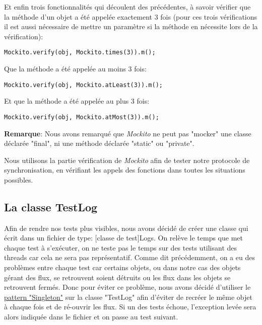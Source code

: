 Et enfin trois fonctionnalités qui découlent des précédentes, à savoir vérifier que la méthode d'un objet a été appelée exactement 3 fois (pour ces trois vérifications il est aussi nécessaire de mettre un paramètre si la méthode en nécessite lors de la vérification):

\begin{lstlisting}
Mockito.verify(obj, Mockito.times(3)).m();
\end{lstlisting}\bigskip

Que la méthode a été appelée au moins 3 fois:

\begin{lstlisting}
Mockito.verify(obj, Mockito.atLeast(3)).m();
\end{lstlisting}\bigskip

Et que la méthode a été appelée au plus 3 fois:

\begin{lstlisting}
Mockito.verify(obj, Mockito.atMost(3)).m();
\end{lstlisting}\bigskip

\textbf{Remarque}: Nous avons remarqué que \textit{Mockito} ne peut pas "mocker" une classe déclarée "final", ni une méthode déclarée "static" ou "private".\newline

Nous utilisons la partie vérification de \textit{Mockito} afin de tester notre protocole de synchronisation, en vérifiant les appels des fonctions dans toutes les situations possibles.

\newpage
\subsection{La classe TestLog}

Afin de rendre nos tests plus visibles, nous avons décidé de créer une classe qui écrit dans un fichier de type: [classe de test]Logs. On relève le temps que met chaque test à s'exécuter, on ne teste pas le temps sur des tests utilisant des threads car cela ne sera pas représentatif. Comme dit précédemment, on a eu des problèmes entre chaque test car certains objets, ou dans notre cas des objets gérant des flux, se retrouvent soient détruits ou les flux dans les objets se retrouvent fermés. Donc pour éviter ce problème, nous avons décidé d'utiliser le \underline{pattern "Singleton"} sur la classe "TestLog" afin d'éviter de recréer le même objet à chaque fois et de ré-ouvrir les flux. Si un des tests échoue, l'exception levée sera alors indiquée dans le fichier et on passe au test suivant.


